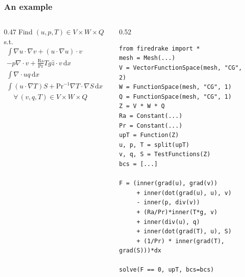 \documentclass[presentation]{beamer}
\begin{document}
\begin{frame}[fragile]
  \frametitle{An example}
  \begin{columns}
    \begin{column}{0.47\framewidth}
      {\footnotesize
        Find $(u, p, T) \in V\times W\times Q$ s.t.
        \begin{align*}
          \int\!\nabla u \cdot \nabla v + (u \cdot \nabla u) \cdot v \\
          - p\nabla\cdot v + \frac{\text{Ra}}{\text{Pr}} Tg \hat{z} \cdot v\,\text{d}x &= 0 \\
          \int\!\nabla\cdot u q\,\text{d}x&= 0\\
          \int\! (u\cdot \nabla T) S + \text{Pr}^{-1} \nabla T \cdot \nabla
          S\,\text{d}x &= 0\\
          \quad \forall\, (v,q,T) \in V\times W \times Q
        \end{align*}
        }
    \end{column}
      \begin{column}{0.52\framewidth}
\begin{verbatim}
from firedrake import *
mesh = Mesh(...)
V = VectorFunctionSpace(mesh, "CG", 2)
W = FunctionSpace(mesh, "CG", 1)
Q = FunctionSpace(mesh, "CG", 1)
Z = V * W * Q
Ra = Constant(...)
Pr = Constant(...)
upT = Function(Z)
u, p, T = split(upT)
v, q, S = TestFunctions(Z)
bcs = [...]

F = (inner(grad(u), grad(v))
     + inner(dot(grad(u), u), v)
     - inner(p, div(v))
     + (Ra/Pr)*inner(T*g, v)
     + inner(div(u), q)
     + inner(dot(grad(T), u), S)
     + (1/Pr) * inner(grad(T), grad(S)))*dx

solve(F == 0, upT, bcs=bcs)
\end{verbatim}
      \end{column}
  \end{columns}
\end{frame}
\end{document}
